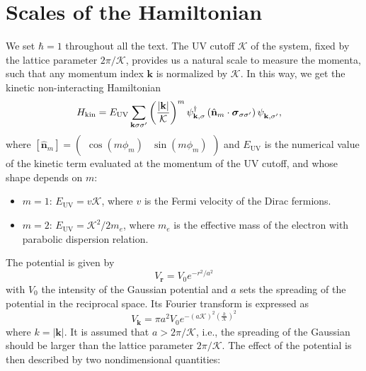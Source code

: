 \documentclass[english,aps,prd,nofootinbib,twocolumn]{revtex4-1}
\begin{document}
\section{Scales of the Hamiltonian}
We set $\hbar = 1$ throughout all the text. The UV cutoff $\mathcal{K}$ of the system, fixed by the lattice parameter $2\pi/\mathcal{K}$, provides us a natural scale to measure the momenta, such that any momentum index $\mathbf{k}$ is normalized by $\mathcal{K}$. In this way, we get the kinetic non-interacting Hamiltonian
\begin{equation}
\label{eq:Main-Ham}
\begin{split}
&H_{\mathrm{kin}} = 
E_{\mathrm{UV} }\sum_{\mathbf{k }\sigma\sigma'}
\left(\frac{|\mathbf{k}|}{\mathcal{K}}\right)^{m}
\psi_{\mathbf{k },\sigma}^{\textcolor{black}{\dagger}}
\left( \hat{\mathbf{n}}_{m} \cdot 
\boldsymbol{\sigma}_{\sigma\sigma'} \right)
\psi_{\mathbf{k },\sigma'}^{\textcolor{white}{\dagger}}
,
\end{split}
\end{equation}
where $[\hat{\mathbf{n}}_{m}]= 
\begin{pmatrix}
\cos(m\phi_{m})	&	\!\!\sin(m\phi_{m})
\end{pmatrix}$ and $E_{\mathrm{UV} }$ is the numerical value of the kinetic term evaluated at the momentum of the UV cutoff, and whose shape depends on $m$:
\begin{itemize}
\item $m=1$: $E_{\mathrm{UV} } = v\mathcal{K}$, where $v$ is the Fermi velocity of the Dirac fermions.
\item $m=2$: $E_{\mathrm{UV} } = \mathcal{K}^{2}/2m_{e}$, where $m_{e}$ is the effective mass of the electron with parabolic dispersion relation. 
\end{itemize}
The potential is given by
\begin{equation}
V_{\mathbf{r}} = 
V_{0}e^{-r^{2}/a^{2}}
\end{equation}
with $V_{0}$ the intensity of the Gaussian potential and $a$ sets the spreading of the potential in the reciprocal space. Its Fourier transform is expressed as
\begin{equation}
V_{\mathbf{k}} = \pi a^{2} V_{0} 
e^{-(a\mathcal{K})^{2}\left( \tfrac{k}{\mathcal{K}} \right)^{2}}
\end{equation}
where $k=|\mathbf{k}|$. It is assumed that $a>2\pi/\mathcal{K}$, i.e., the spreading of the Gaussian should be larger than the lattice parameter $2\pi/\mathcal{K}$. The effect of the potential is then described by two nondimensional quantities:
\end{document}
